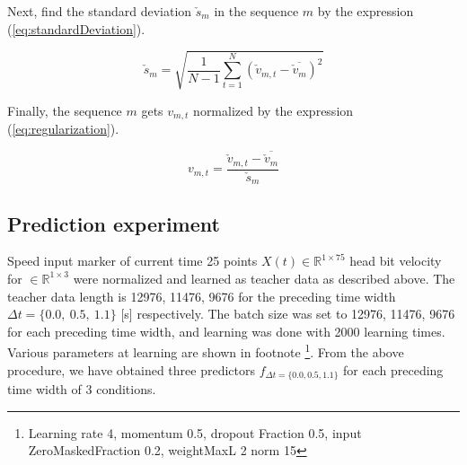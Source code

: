 \documentclass{sigchi}
\begin{document}
Next, find the standard deviation $ \check {s}_m $ in the sequence $ m $ by the expression (\ref{eq:standardDeviation}).

\begin{equation}
  \check{s}_m = \sqrt{ \frac{1}{N-1}\sum^{N}_{t=1} ( \check{v}_{m,t} - \overline{\check{v}_m} ) ^2} 			
\label{eq:standardDeviation}
\end{equation}

Finally, the sequence $ m $ gets $ v_{m, t} $ normalized by the expression (\ref{eq:regularization}).

\begin{equation}
  v_{m,t} = \frac{\check{v}_{m,t} - \overline{\check{v}_{m}}}{\check{s}_m} 
  \label{eq:regularization}
\end{equation}


\subsection{Prediction experiment}
Speed input marker of current time 25 points $ X (t) \in \mathbb {R} ^ {1 \times 75} $ head bit velocity for $ \in \mathbb {R}^{ 1 \times 3} $ were normalized and learned as teacher data as described above. The teacher data length is 12976, 11476, 9676 for the preceding time width $ \Delta t = \{0.0, \ 0.5, \ 1.1 \} $ [s] respectively. The batch size was set to 12976, 11476, 9676 for each preceding time width, and learning was done with 2000 learning times. Various parameters at learning are shown in footnote \footnote{Learning rate 4, momentum 0.5, dropout Fraction 0.5, input ZeroMaskedFraction 0.2, weightMaxL 2 norm 15}. From the above procedure, we have obtained three predictors $ f_{\Delta t = \{0.0, 0.5, 1.1 \}} $ for each preceding time width of 3 conditions.
\end{document}
